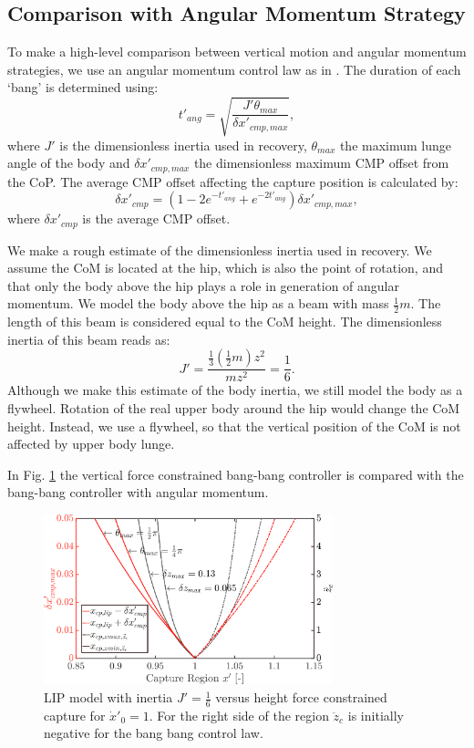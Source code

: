 \documentclass[letterpaper, 10 pt, conference]{ieeeconf}  %
\begin{document}
\subsection{Comparison with Angular Momentum Strategy}
To make a high-level comparison between vertical motion and angular momentum strategies, we use an angular momentum control law as in \cite{pratt2006capture,stephens2007humanoid,koolen2012capturability}. The duration of each `bang' is determined using:
\begin{equation}	
	t'_{ang} = \sqrt{\frac{J'\theta_{max}}{\delta x'_{cmp,max}}},
\end{equation}
where $J'$ is the dimensionless inertia used in recovery, $\theta_{max}$ the maximum lunge angle of the body and $\delta x'_{cmp,max}$ the dimensionless maximum CMP offset from the CoP. The average CMP offset affecting the capture position is calculated by:
\begin{equation}
 \delta x'_{cmp} = (1 -2e^{-t'_{ang}}+e^{-2t'_{ang}})\delta x'_{cmp,max},
\end{equation}
where $\delta x'_{cmp}$ is the average CMP offset.

We make a rough estimate of the dimensionless inertia used in recovery. We assume the CoM is located at the hip, which is also the point of rotation, and that only the body above the hip plays a role in generation of angular momentum. We model the body above the hip as a beam with mass $\frac{1}{2}m$. The length of this beam is considered equal to the CoM height. The dimensionless inertia of this beam reads as:
\begin{equation}
	J' = \frac{\frac{1}{3}(\frac{1}{2}m)z^2}{mz^2} = \frac{1}{6}.
\end{equation}
Although we make this estimate of the body inertia, we still model the body as a flywheel. Rotation of the real upper body around the hip would change the CoM height. Instead, we use a flywheel, so that the vertical position of the CoM is not affected by upper body lunge.

In Fig. \ref{fig:compare} the vertical force constrained bang-bang controller is compared with the bang-bang controller with angular momentum.

\begin{figure}
      \centering
      \includegraphics[width=3.3in]{capcompare.png}
      \caption{LIP model with inertia $J'=\frac{1}{6}$ versus height force constrained capture for $\dot{x}'_0=1$. For the right side of the region $\ddot{z}_c$ is initially negative for the bang bang control law.}
      \label{fig:compare}
\end{figure}
\end{document}
